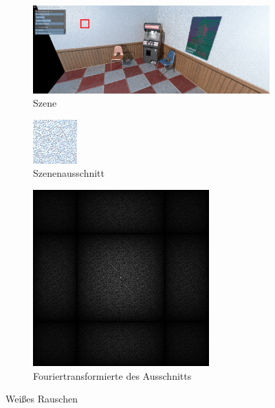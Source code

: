 \begin{figure}[H]
    \begin{subfigure}{\textwidth}
        \centering \includegraphics[scale=.2]{content/TemporalerAlg/Bilder/WhiteNoise/white_noise.png}
        \caption{Szene}
        \label{fig:Szene_Weißes Rauschen}
    \end{subfigure}
    \begin{subfigure}{0.5\textwidth}
        \centering \includegraphics[width=0.5\linewidth]{content/TemporalerAlg/Bilder/WhiteNoise/white_noise_64x64.jpg} 
        \caption{Szenenausschnitt}
        \label{fig:ausschnitt_Weißes_Rauschen}
    \end{subfigure}
    \begin{subfigure}{0.5\textwidth}
        \centering \includegraphics[width=0.5\linewidth]{content/TemporalerAlg/Bilder/WhiteNoise/white_noise_64x64_fourier.png}
        \caption{Fouriertransformierte des Ausschnitts}
        \label{fig:Fouriertransformierte_Weißes_Rauschen}
    \end{subfigure}
        \caption{Weißes Rauschen}
        \label{fig:Path Tracer mit zufälligen Seeds}
\end{figure}


